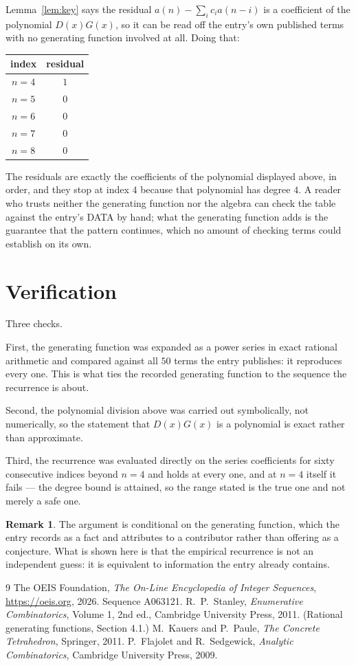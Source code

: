 \documentclass[11pt,a4paper]{article}
\theoremstyle{plain}
\theoremstyle{definition}
\newtheorem{remark}[theorem]{Remark}
\begin{document}
Lemma~\ref{lem:key} says the residual $a(n)-\sum_ic_ia(n-i)$ is a coefficient of the
polynomial $D(x)G(x)$, so it can be read off the entry's own published terms with no
generating function involved at all. Doing that:
\begin{center}
\begin{tabular}{cc}
index & residual \\ \hline
$n=4$ & $1$ \\
$n=5$ & $0$ \\
$n=6$ & $0$ \\
$n=7$ & $0$ \\
$n=8$ & $0$
\end{tabular}
\end{center}
The residuals are exactly the coefficients of the polynomial displayed above, in order, and
they stop at index $4$ because that polynomial has degree $4$. A reader who trusts
neither the generating function nor the algebra can check the table against the entry's DATA
by hand; what the generating function adds is the guarantee that the pattern continues, which
no amount of checking terms could establish on its own.

\section{Verification}

Three checks.

First, the generating function was expanded as a power series in exact rational arithmetic and
compared against all $50$ terms the entry publishes: it reproduces every one. This is
what ties the recorded generating function to the sequence the recurrence is about.

Second, the polynomial division above was carried out symbolically, not numerically, so the
statement that $D(x)G(x)$ is a polynomial is exact rather than approximate.

Third, the recurrence was evaluated directly on the series coefficients for sixty consecutive
indices beyond $n=4$ and holds at every one, and at $n=4$ itself it fails --- the
degree bound is attained, so the range stated is the true one and not merely a safe one.

\begin{remark}
The argument is conditional on the generating function, which the entry records as a fact and
attributes to a contributor rather than offering as a conjecture. What is shown here is that
the empirical recurrence is not an independent guess: it is equivalent to information the
entry already contains.
\end{remark}

\begin{thebibliography}{9}
 The OEIS Foundation, \emph{The On-Line Encyclopedia of Integer
Sequences}, \url{https://oeis.org}, 2026. Sequence A063121.
 R.~P.~Stanley, \emph{Enumerative Combinatorics}, Volume 1, 2nd ed.,
Cambridge University Press, 2011. (Rational generating functions, Section 4.1.)
 M.~Kauers and P.~Paule, \emph{The Concrete Tetrahedron}, Springer, 2011.
 P.~Flajolet and R.~Sedgewick, \emph{Analytic Combinatorics}, Cambridge
University Press, 2009.
\end{thebibliography}
\end{document}
